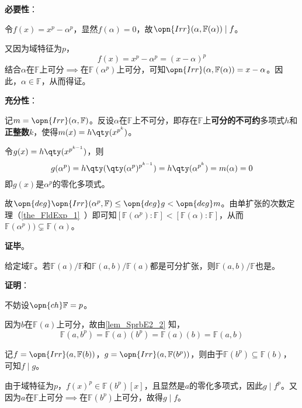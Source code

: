 \textbf{必要性}：

令$f(x)=x^p-\alpha^p$，显然$f(\alpha)=0$，故$\opn{Irr}(\alpha, \mathbb{F}(\alpha))\mid f$。

又因为域特征为$p$，
\begin{equation}
    f(x) = x^p-\alpha^p = (x-\alpha)^p
\end{equation}
结合$\alpha$在$\mathbb{F}$上可分$\implies$在$\mathbb{F}(\alpha^p)$上可分，可知$\opn{Irr}(\alpha, \mathbb{F}(\alpha))=x-\alpha$。因此，$\alpha\in\mathbb{F}$，从而得证。

\textbf{充分性}：

记$m=\opn{Irr}(\alpha, \mathbb{F})$。反设$\alpha$在$\mathbb{F}$上不可分，即存在$\mathbb{F}$上\textbf{可分的不可约}多项式$h$和\textbf{正整数}$k$，使得$m(x)=h\qty(x^{p^k})$。

令$g(x)=h\qty(x^{p^{k-1}})$，则
\begin{equation}
    g(\alpha^p)= h\qty(\qty(\alpha^{p})^{p^{k-1}}) = h\qty(\alpha^{p^k}) = m(\alpha) = 0
\end{equation}
即$g(x)$是$\alpha^p$的零化多项式。

故$\opn{deg}\opn{Irr}(\alpha^p, \mathbb{F})\leq \opn{deg}g< \opn{deg}m$。由单扩张的次数定理（\autoref{the_FldExp_1}~）即可知$[\mathbb{F}(\alpha^p):\mathbb{F}]<[\mathbb{F}(\alpha):\mathbb{F}]$，从而$\mathbb{F}(\alpha^p))\subsetneq\mathbb{F}(\alpha)$。

\textbf{证毕}。





\begin{lemma}{}
给定域$\mathbb{F}$。若$\mathbb{F}(a)/\mathbb{F}$和$\mathbb{F}(a, b)/\mathbb{F}(a)$都是可分扩张，则$\mathbb{F}(a, b)/\mathbb{F}$也是。
\end{lemma}

\textbf{证明}：

不妨设$\opn{ch}\mathbb{F}=p$。

因为$b$在$\mathbb{F}(a)$上可分，故由\autoref{lem_SprbE2_2} 知，
\begin{equation}\label{eq_SprbE2_1}
    \mathbb{F}(a, b^p) = \mathbb{F}(a)(b^p) = \mathbb{F}(a)(b) = \mathbb{F}(a, b)
\end{equation}




记$f=\opn{Irr}(a, \mathbb{F}(b))$，$g=\opn{Irr}(a, \mathbb{F}(b^p))$，则由于$\mathbb{F}(b^p)\subseteq\mathbb{F}(b)$，可知$f\mid g$。

由于域特征为$p$，$f(x)^p\in\mathbb{F}(b^p)[x]$，且显然是$a$的零化多项式，因此$g\mid f^p$。又因为$a$在$\mathbb{F}$上可分$\implies$在$\mathbb{F}(b^p)$上可分，故得$g\mid f$。

